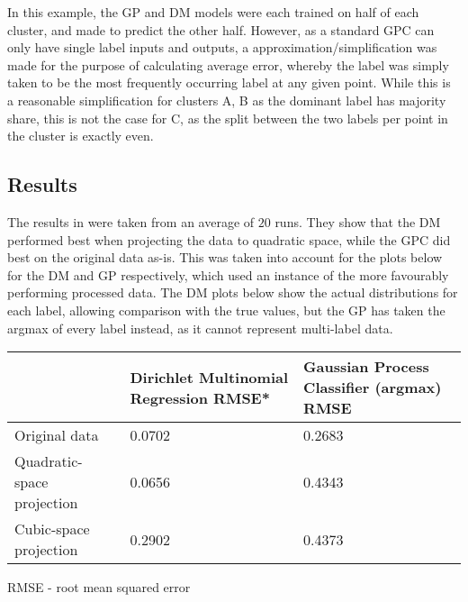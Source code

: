 In this example, the GP and DM models were each trained on half of each cluster, and made to predict the other half. However, as a standard GPC can only have single label inputs and outputs, a approximation/simplification was made for the purpose of calculating average error, whereby the label was simply taken to be the most frequently occurring label at any given point. While this is a reasonable simplification for clusters A, B as the dominant label has majority share, this is not the case for C, as the split between the two labels per point in the cluster is exactly even. 

\subsection{Results}

The results in  were taken from an average of $20$ runs. They show that the DM performed best when projecting the data to quadratic space, while the GPC did best on the original data as-is. This was taken into account for the plots below for the DM and GP respectively, which used an instance of the more favourably performing processed data. The DM plots below show the actual distributions for each label, allowing comparison with the true values, but the GP has taken the argmax of every label instead, as it cannot represent multi-label data.

\begin{table}[H]
    \label{table:toy_gm_vs_gp}
    \begin{tabular}{|C{4cm}|C{4cm}|C{6cm}|}
        \hline
        & Dirichlet Multinomial Regression RMSE* & Gaussian Process Classifier (argmax) RMSE \\\hline
        Original data & 0.0702 & 0.2683\\\hline
        Quadratic-space projection & 0.0656 & 0.4343\\\hline
        Cubic-space projection & 0.2902 & 0.4373 \\\hline
    \end{tabular}
    \begingroup
    \small{RMSE - root mean squared error}
    \endgroup
\end{table}

